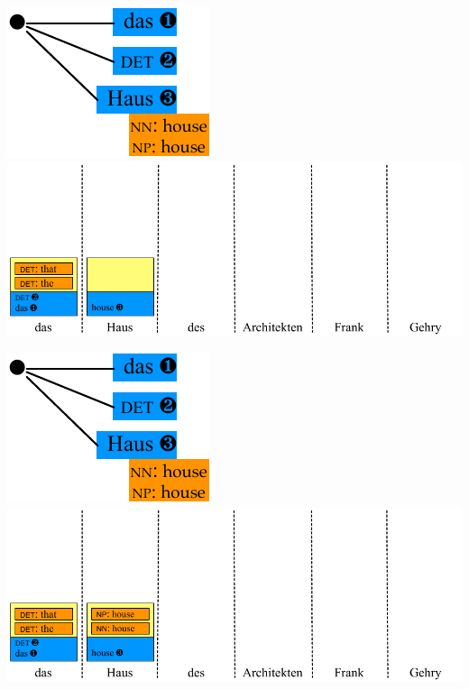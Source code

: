 \documentclass[landscape]{slides}
\begin{document}

\begin{center}\vspace{7mm}
\includegraphics[scale=1.4]{accessing-grammar-rules-prefix-early4.pdf}\\[8mm]
\includegraphics[scale=1.4]{accessing-grammar-rules-early-example5.pdf}
\end{center}


\begin{center}\vspace{7mm}
\includegraphics[scale=1.4]{accessing-grammar-rules-prefix-early4.pdf}\\[8mm]
\includegraphics[scale=1.4]{accessing-grammar-rules-early-example6.pdf}
\end{center}
\end{document}
